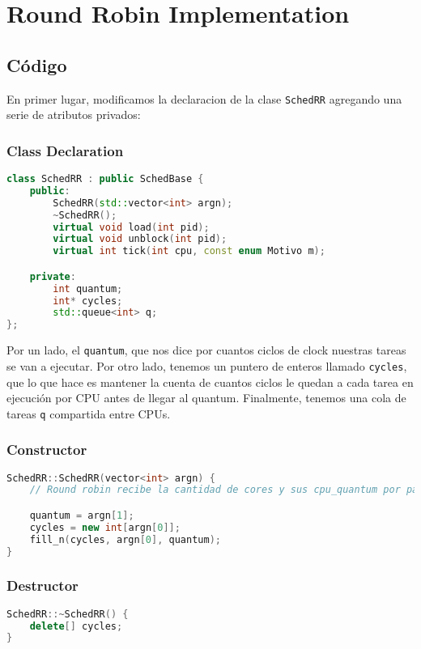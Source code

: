 \section{Round Robin Implementation}

\subsection{Código}

En primer lugar, modificamos la declaracion de la clase  \texttt{SchedRR} agregando una serie de atributos privados:

\subsubsection{Class Declaration}
\begin{lstlisting}[language=C++, breaklines=true]
class SchedRR : public SchedBase {
	public:
		SchedRR(std::vector<int> argn);
        ~SchedRR();
		virtual void load(int pid);
		virtual void unblock(int pid);
		virtual int tick(int cpu, const enum Motivo m);

	private:
		int quantum;
		int* cycles;
		std::queue<int> q;
};
\end{lstlisting}

Por un lado, el \texttt{quantum}, que nos dice por cuantos ciclos de clock nuestras tareas se van a ejecutar. Por otro lado, tenemos un puntero de enteros llamado \texttt{cycles}, que lo que hace es mantener la cuenta de cuantos ciclos le quedan a cada tarea en ejecución por CPU antes de llegar al quantum. Finalmente, tenemos una cola de tareas \texttt{q} compartida entre CPUs.

\subsubsection{Constructor}
\begin{lstlisting}[language=C++, breaklines=true]
SchedRR::SchedRR(vector<int> argn) {
	// Round robin recibe la cantidad de cores y sus cpu_quantum por parametro

	quantum = argn[1];
	cycles = new int[argn[0]];
	fill_n(cycles, argn[0], quantum); 
}
\end{lstlisting}

\subsubsection{Destructor}
\begin{lstlisting}[language=C++, breaklines=true]
SchedRR::~SchedRR() {
	delete[] cycles;
}
\end{lstlisting}

